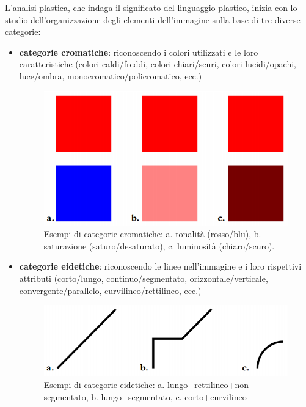 \documentclass[11pt,a4paper]{article}
\begin{document}
L'analisi plastica, che indaga il significato del linguaggio plastico, inizia con lo studio dell'organizzazione degli elementi dell'immagine sulla base di tre diverse categorie:
\begin{itemize}
	\item \textbf{categorie cromatiche}: riconoscendo i colori utilizzati e le loro caratteristiche (colori caldi/freddi, colori chiari/scuri, colori lucidi/opachi, luce/ombra, monocromatico/policromatico, ecc.)
		\begin{figure}
			\begin{center}
				\includegraphics[scale=0.6]{img/010.png}
			\end{center}
			\caption{Esempi di categorie cromatiche: a. tonalità (rosso/blu), b. saturazione (saturo/desaturato), c. luminosità (chiaro/scuro).}
		\end{figure}
	\item \textbf{categorie eidetiche}: riconoscendo le linee nell'immagine e i loro rispettivi attributi (corto/lungo, continuo/segmentato, orizzontale/verticale, convergente/parallelo, curvilineo/rettilineo, ecc.)
		\begin{figure}
			\begin{center}
				\includegraphics[scale=0.6]{img/011.png}
			\end{center}
			\caption{Esempi di categorie eidetiche: a. lungo+rettilineo+non segmentato, b. lungo+segmentato, c. corto+curvilineo}
		\end{figure}

\end{itemize}
\end{document}
